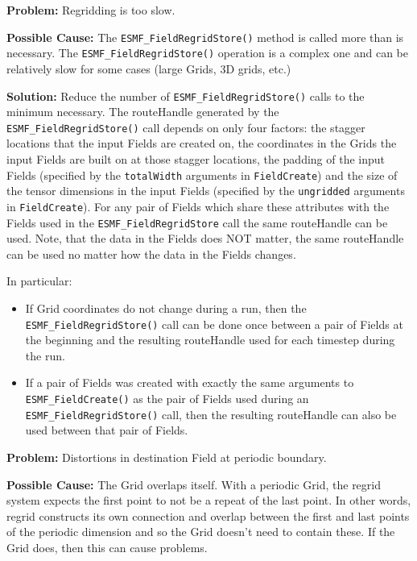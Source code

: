  \bigskip
 
 {\bf Problem:} Regridding is too slow.

 \medskip

 {\bf Possible Cause:} The {\tt ESMF\_FieldRegridStore()} method is called more than is necessary. \newline
 The {\tt ESMF\_FieldRegridStore()} operation is a complex one and can be 
 relatively slow for some cases (large Grids, 3D grids, etc.) 
 
 \smallskip

 {\bf Solution:} Reduce the number of {\tt ESMF\_FieldRegridStore()} calls to the minimum necessary. The
 routeHandle generated by the {\tt ESMF\_FieldRegridStore()} call depends on only four factors: the 
 stagger locations that the input Fields are created on, the coordinates in the Grids the input Fields
 are built on at those stagger locations, the padding of the input Fields 
 (specified by the {\tt totalWidth} arguments in {\tt FieldCreate}) and the size of the tensor
 dimensions in the input Fields (specified by the {\tt ungridded} arguments in {\tt FieldCreate}). 
 For any pair of Fields which share these attributes with the Fields used in the
 {\tt ESMF\_FieldRegridStore} call  the same routeHandle can be used. Note, that the data in the 
 Fields does NOT matter, the same routeHandle can be used no matter how the data in the Fields changes.

 \smallskip

 In particular:
 \begin{itemize}

 \item If Grid coordinates do not change during a run, then the {\tt ESMF\_FieldRegridStore()} call can be
 done once between a pair of Fields at the beginning and the resulting routeHandle used for each 
 timestep during the run. 

 \item If a pair of Fields was created with exactly the same arguments to {\tt ESMF\_FieldCreate()} as the 
 pair of Fields used during an {\tt ESMF\_FieldRegridStore()} call, then the resulting routeHandle can 
 also be used between that pair of Fields. 
 \end{itemize}

 \bigskip
 
 {\bf Problem:} Distortions in destination Field at periodic boundary.

 \medskip

 {\bf Possible Cause:} The Grid overlaps itself. With a periodic Grid, the regrid system expects
  the first point to not be a repeat of the last point. In other words,
  regrid constructs its own connection and overlap between the first and last points of the
  periodic dimension and so the Grid doesn't need to contain these. If the Grid does, then this
  can cause problems. 

